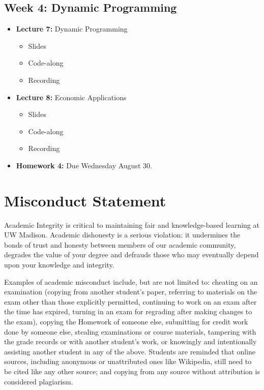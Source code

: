 \documentclass[
]{book}
\providecommand{\tightlist}{%
  \setlength{\itemsep}{0pt}\setlength{\parskip}{0pt}}
\begin{document}
\hypertarget{week-4-dynamic-programming}{%
\subsection{Week 4: Dynamic Programming}\label{week-4-dynamic-programming}}

\begin{itemize}
\tightlist
\item
  \textbf{Lecture 7:} Dynamic Programming

  \begin{itemize}
  \tightlist
  \item
    Slides
  \item
    Code-along
  \item
    Recording
  \end{itemize}
\item
  \textbf{Lecture 8:} Economic Applications

  \begin{itemize}
  \tightlist
  \item
    Slides
  \item
    Code-along
  \item
    Recording
  \end{itemize}
\item
  \textbf{Homework 4:} Due Wednesday August 30.
\end{itemize}

\hypertarget{misconduct-statement}{%
\section{Misconduct Statement}\label{misconduct-statement}}

Academic Integrity is critical to maintaining fair and knowledge-based learning at UW Madison. Academic dishonesty is a serious violation: it undermines the bonds of trust and honesty between members of our academic community, degrades the value of your degree and defrauds those who may eventually depend upon your knowledge and integrity.

Examples of academic misconduct include, but are not limited to: cheating on an examination (copying from another student's paper, referring to materials on the exam other than those explicitly permitted, continuing to work on an exam after the time has expired, turning in an exam for regrading after making changes to the exam), copying the Homework of someone else, submitting for credit work done by someone else, stealing examinations or course materials, tampering with the grade records or with another student's work, or knowingly and intentionally assisting another student in any of the above. Students are reminded that online sources, including anonymous or unattributed ones like Wikipedia, still need to be cited like any other source; and copying from any source without attribution is considered plagiarism.
\end{document}

